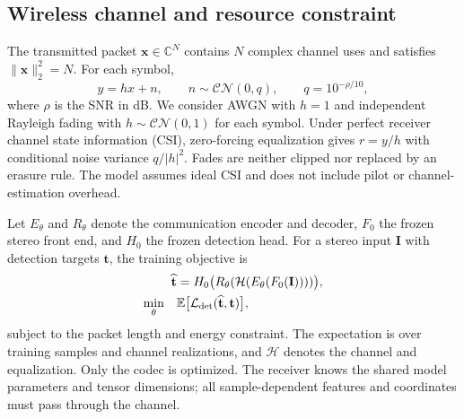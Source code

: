 \documentclass[conference]{IEEEtran}
\newcommand{\E}{\mathbb{E}}
\newcommand{\CN}{\mathcal{CN}}
\begin{document}
\subsection{Wireless channel and resource constraint}
The transmitted packet $\mathbf x\in\mathbb C^N$ contains $N$ complex
channel uses and satisfies $\|\mathbf x\|_2^2=N$. For each symbol,
\begin{equation}
 y=hx+n,\qquad n\sim\CN(0,q),\qquad q=10^{-\rho/10},
 \label{eq:channel}
\end{equation}
where $\rho$ is the SNR in dB. We consider AWGN with $h=1$ and independent
Rayleigh fading with $h\sim\CN(0,1)$ for each symbol. Under perfect
receiver channel state information (CSI), zero-forcing equalization gives
$r=y/h$ with conditional noise variance $q/|h|^2$. Fades are neither
clipped nor replaced by an erasure rule. The model assumes ideal CSI and
does not include pilot or channel-estimation overhead.

Let $E_\theta$ and $R_\theta$ denote the communication encoder and decoder,
$F_0$ the frozen stereo front end, and $H_0$ the frozen detection head.
For a stereo input $\mathbf I$ with detection targets $\mathbf t$, the
training objective is
\begin{equation}
 \begin{aligned}
 \widehat{\mathbf t}
 &=H_0\bigl(R_\theta(\mathcal H(E_\theta(F_0(\mathbf I))))\bigr),\\
 \min_\theta\quad &\E\bigl[\mathcal L_{\rm det}
   (\widehat{\mathbf t},\mathbf t)\bigr],
 \end{aligned}
 \label{eq:objective}
\end{equation}
subject to the packet length and energy constraint. The expectation is over
training samples and channel realizations, and $\mathcal H$ denotes the
channel and equalization. Only the codec is optimized. The receiver knows
the shared model parameters and tensor dimensions; all sample-dependent
features and coordinates must pass through the channel.
\end{document}
